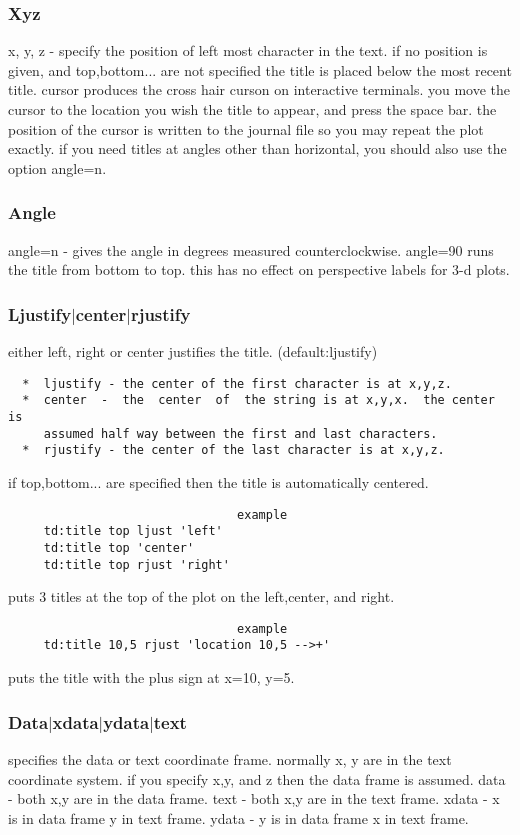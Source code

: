 \subsubsection{Xyz}
x,  y, z - specify the position of left most character in the text.  if
no position is given, and top,bottom...  are not specified the title is
placed  below  the  most  recent title.  cursor produces the cross hair
curson on interactive terminals.  you move the cursor to  the  location
you wish the title to appear, and press the space bar.  the position of
the cursor is written to the journal file so you may  repeat  the  plot
exactly.   if  you  need  titles  at  angles other than horizontal, you
should also use the option angle=n.  
\subsubsection{Angle}
angle=n  -  gives  the  angle  in  degrees  measured  counterclockwise.
angle=90 runs the title from bottom to top.   this  has  no  effect  on
perspective labels for 3-d plots.  
\subsubsection{Ljustify$|$center$|$rjustify}
either left, right or center justifies the title.  (default:ljustify) 
\begin{verbatim}
  *  ljustify - the center of the first character is at x,y,z.  
  *  center  -  the  center  of  the string is at x,y,x.  the center is
     assumed half way between the first and last characters.  
  *  rjustify - the center of the last character is at x,y,z.  
\end{verbatim}
if  top,bottom...   are  specified  then  the  title  is  automatically
centered.  

\begin{verbatim}
                                example
     td:title top ljust 'left' 
     td:title top 'center' 
     td:title top rjust 'right' 
\end{verbatim}
puts 3 titles at the top of the plot on the left,center, and right.  

\begin{verbatim}
                                example
     td:title 10,5 rjust 'location 10,5 -->+' 
\end{verbatim}
puts the title with the plus sign at x=10, y=5.  
\subsubsection{Data$|$xdata$|$ydata$|$text}
specifies  the data or text coordinate frame.  normally x, y are in the
text coordinate system.  if you specify x,y, and z then the data  frame
is assumed.  
data - both x,y are in the data frame.  
text - both x,y are in the text frame.  
xdata - x is in data frame y in text frame.  
ydata - y is in data frame x in text frame.  

